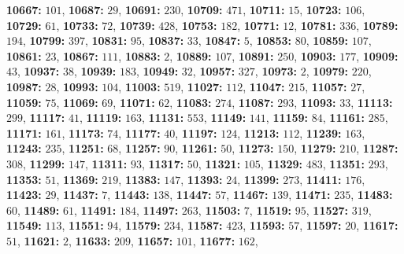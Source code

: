 \textsf{\bfseries 10667:} $101$, \textsf{\bfseries 10687:} $29$, \textsf{\bfseries 10691:} $230$, \textsf{\bfseries 10709:} $471$, \textsf{\bfseries 10711:} $15$, \textsf{\bfseries 10723:} $106$, \textsf{\bfseries 10729:} $61$, \textsf{\bfseries 10733:} $72$, \textsf{\bfseries 10739:} $428$, \textsf{\bfseries 10753:} $182$, \textsf{\bfseries 10771:} $12$, \textsf{\bfseries 10781:} $336$, \textsf{\bfseries 10789:} $194$, \textsf{\bfseries 10799:} $397$, \textsf{\bfseries 10831:} $95$, \textsf{\bfseries 10837:} $33$, \textsf{\bfseries 10847:} $5$, \textsf{\bfseries 10853:} $80$, \textsf{\bfseries 10859:} $107$, \textsf{\bfseries 10861:} $23$, \textsf{\bfseries 10867:} $111$, \textsf{\bfseries 10883:} $2$, \textsf{\bfseries 10889:} $107$, \textsf{\bfseries 10891:} $250$, \textsf{\bfseries 10903:} $177$, \textsf{\bfseries 10909:} $43$, \textsf{\bfseries 10937:} $38$, \textsf{\bfseries 10939:} $183$, \textsf{\bfseries 10949:} $32$, \textsf{\bfseries 10957:} $327$, \textsf{\bfseries 10973:} $2$, \textsf{\bfseries 10979:} $220$, \textsf{\bfseries 10987:} $28$, \textsf{\bfseries 10993:} $104$, \textsf{\bfseries 11003:} $519$, \textsf{\bfseries 11027:} $112$, \textsf{\bfseries 11047:} $215$, \textsf{\bfseries 11057:} $27$, \textsf{\bfseries 11059:} $75$, \textsf{\bfseries 11069:} $69$, \textsf{\bfseries 11071:} $62$, \textsf{\bfseries 11083:} $274$, \textsf{\bfseries 11087:} $293$, \textsf{\bfseries 11093:} $33$, \textsf{\bfseries 11113:} $299$, \textsf{\bfseries 11117:} $41$, \textsf{\bfseries 11119:} $163$, \textsf{\bfseries 11131:} $553$, \textsf{\bfseries 11149:} $141$, \textsf{\bfseries 11159:} $84$, \textsf{\bfseries 11161:} $285$, \textsf{\bfseries 11171:} $161$, \textsf{\bfseries 11173:} $74$, \textsf{\bfseries 11177:} $40$, \textsf{\bfseries 11197:} $124$, \textsf{\bfseries 11213:} $112$, \textsf{\bfseries 11239:} $163$, \textsf{\bfseries 11243:} $235$, \textsf{\bfseries 11251:} $68$, \textsf{\bfseries 11257:} $90$, \textsf{\bfseries 11261:} $50$, \textsf{\bfseries 11273:} $150$, \textsf{\bfseries 11279:} $210$, \textsf{\bfseries 11287:} $308$, \textsf{\bfseries 11299:} $147$, \textsf{\bfseries 11311:} $93$, \textsf{\bfseries 11317:} $50$, \textsf{\bfseries 11321:} $105$, \textsf{\bfseries 11329:} $483$, \textsf{\bfseries 11351:} $293$, \textsf{\bfseries 11353:} $51$, \textsf{\bfseries 11369:} $219$, \textsf{\bfseries 11383:} $147$, \textsf{\bfseries 11393:} $24$, \textsf{\bfseries 11399:} $273$, \textsf{\bfseries 11411:} $176$, \textsf{\bfseries 11423:} $29$, \textsf{\bfseries 11437:} $7$, \textsf{\bfseries 11443:} $138$, \textsf{\bfseries 11447:} $57$, \textsf{\bfseries 11467:} $139$, \textsf{\bfseries 11471:} $235$, \textsf{\bfseries 11483:} $60$, \textsf{\bfseries 11489:} $61$, \textsf{\bfseries 11491:} $184$, \textsf{\bfseries 11497:} $263$, \textsf{\bfseries 11503:} $7$, \textsf{\bfseries 11519:} $95$, \textsf{\bfseries 11527:} $319$, \textsf{\bfseries 11549:} $113$, \textsf{\bfseries 11551:} $94$, \textsf{\bfseries 11579:} $234$, \textsf{\bfseries 11587:} $423$, \textsf{\bfseries 11593:} $57$, \textsf{\bfseries 11597:} $20$, \textsf{\bfseries 11617:} $51$, \textsf{\bfseries 11621:} $2$, \textsf{\bfseries 11633:} $209$, \textsf{\bfseries 11657:} $101$, \textsf{\bfseries 11677:} $162$, 
